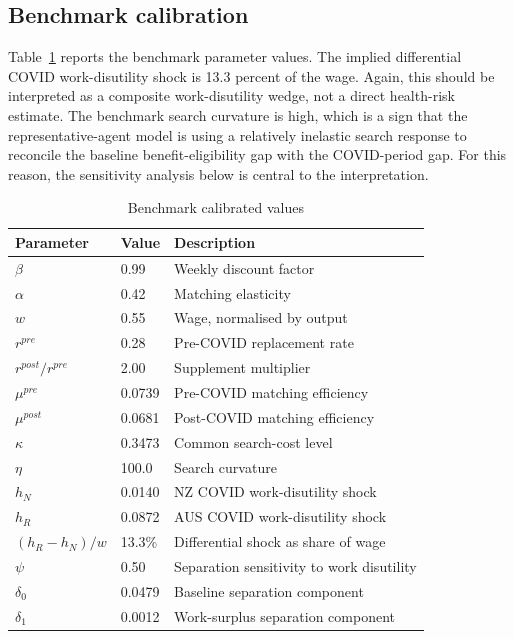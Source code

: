 \subsection{Benchmark calibration}

Table~\ref{tab:model_parameters_14} reports the benchmark parameter values. The implied differential COVID work-disutility shock is 13.3 percent of the wage. Again, this should be interpreted as a composite work-disutility wedge, not a direct health-risk estimate. The benchmark search curvature is high, which is a sign that the representative-agent model is using a relatively inelastic search response to reconcile the baseline benefit-eligibility gap with the COVID-period gap. For this reason, the sensitivity analysis below is central to the interpretation.

\begin{table}[htbp]
    \centering
    \caption{Benchmark calibrated values}
    \label{tab:model_parameters_14}
    \begin{tabular}{lll}
        \toprule
        Parameter & Value & Description \\
        \midrule
        $\beta$ & 0.99 & Weekly discount factor \\
        $\alpha$ & 0.42 & Matching elasticity \\
        $w$ & 0.55 & Wage, normalised by output \\
        $r^{pre}$ & 0.28 & Pre-COVID replacement rate \\
        $r^{post}/r^{pre}$ & 2.00 & Supplement multiplier \\
        $\mu^{pre}$ & 0.0739 & Pre-COVID matching efficiency \\
        $\mu^{post}$ & 0.0681 & Post-COVID matching efficiency \\
        $\kappa$ & 0.3473 & Common search-cost level \\
        $\eta$ & 100.0 & Search curvature \\
        $h_N$ & 0.0140 & NZ COVID work-disutility shock \\
        $h_R$ & 0.0872 & AUS COVID work-disutility shock \\
        $(h_R-h_N)/w$ & 13.3\% & Differential shock as share of wage \\
        $\psi$ & 0.50 & Separation sensitivity to work disutility \\
        $\delta_0$ & 0.0479 & Baseline separation component \\
        $\delta_1$ & 0.0012 & Work-surplus separation component \\
        \bottomrule
    \end{tabular}
\end{table}

